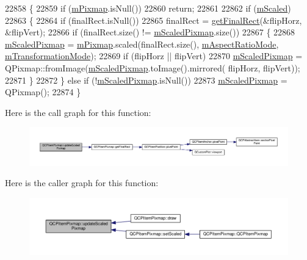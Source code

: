 \begin{DoxyCode}
22858 \{
22859   \textcolor{keywordflow}{if} (\hyperlink{class_q_c_p_item_pixmap_a1396cce7f26c7b8e9512906284380c4d}{mPixmap}.isNull())
22860     \textcolor{keywordflow}{return};
22861   
22862   \textcolor{keywordflow}{if} (\hyperlink{class_q_c_p_item_pixmap_a8fe670a529cd46a9b8afd9fc1203bc3f}{mScaled})
22863   \{
22864     \textcolor{keywordflow}{if} (finalRect.isNull())
22865       finalRect = \hyperlink{class_q_c_p_item_pixmap_a245ef0c626cab7096a810442f2f6a2d9}{getFinalRect}(&flipHorz, &flipVert);
22866     \textcolor{keywordflow}{if} (finalRect.size() != \hyperlink{class_q_c_p_item_pixmap_a2ebc66e15b9f1264563d58f29ba1bc00}{mScaledPixmap}.size())
22867     \{
22868       \hyperlink{class_q_c_p_item_pixmap_a2ebc66e15b9f1264563d58f29ba1bc00}{mScaledPixmap} = \hyperlink{class_q_c_p_item_pixmap_a1396cce7f26c7b8e9512906284380c4d}{mPixmap}.scaled(finalRect.size(), 
      \hyperlink{class_q_c_p_item_pixmap_a8dc6b6c1e106ac523efae22d5fe55bab}{mAspectRatioMode}, \hyperlink{class_q_c_p_item_pixmap_ac9ecad3b9842363754e32eda2cf821bd}{mTransformationMode});
22869       \textcolor{keywordflow}{if} (flipHorz || flipVert)
22870         \hyperlink{class_q_c_p_item_pixmap_a2ebc66e15b9f1264563d58f29ba1bc00}{mScaledPixmap} = QPixmap::fromImage(\hyperlink{class_q_c_p_item_pixmap_a2ebc66e15b9f1264563d58f29ba1bc00}{mScaledPixmap}.toImage().mirrored(
      flipHorz, flipVert));
22871     \}
22872   \} \textcolor{keywordflow}{else} \textcolor{keywordflow}{if} (!\hyperlink{class_q_c_p_item_pixmap_a2ebc66e15b9f1264563d58f29ba1bc00}{mScaledPixmap}.isNull())
22873     \hyperlink{class_q_c_p_item_pixmap_a2ebc66e15b9f1264563d58f29ba1bc00}{mScaledPixmap} = QPixmap();
22874 \}
\end{DoxyCode}


Here is the call graph for this function\+:\nopagebreak
\begin{figure}[H]
\begin{center}
\leavevmode
\includegraphics[width=350pt]{class_q_c_p_item_pixmap_a8bced3027b326b290726cd1979c7cfc6_cgraph}
\end{center}
\end{figure}




Here is the caller graph for this function\+:\nopagebreak
\begin{figure}[H]
\begin{center}
\leavevmode
\includegraphics[width=350pt]{class_q_c_p_item_pixmap_a8bced3027b326b290726cd1979c7cfc6_icgraph}
\end{center}
\end{figure}




